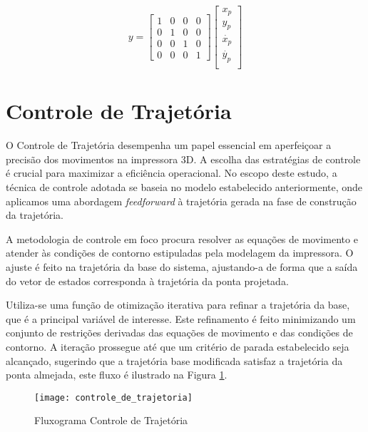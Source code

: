 \begin{equation}
    \label{eq:said_espa_esp}
    y
    =
    \begin{bmatrix}
        1 & 0 & 0 & 0 \\
        0 & 1 & 0 & 0 \\
        0 & 0 & 1 & 0 \\
        0 & 0 & 0 & 1
    \end{bmatrix}
    \begin{bmatrix}
        x_p \\    
        y_p \\
        \dot{x_p} \\    
        \dot{y_p} \\
    \end{bmatrix}
\end{equation}

\section{Controle de Trajetória}
O Controle de Trajetória desempenha um papel essencial em aperfeiçoar a precisão dos movimentos na impressora 3D. A escolha das estratégias de controle é crucial para maximizar a eficiência operacional. No escopo deste estudo, a técnica de controle adotada se baseia no modelo estabelecido anteriormente, onde aplicamos uma abordagem \textit{feedforward} à trajetória gerada na fase de construção da trajetória.

A metodologia de controle em foco procura resolver as equações de movimento e atender às condições de contorno estipuladas pela modelagem da impressora. O ajuste é feito na trajetória da base do sistema, ajustando-a de forma que a saída do vetor de estados corresponda à trajetória da ponta projetada.

Utiliza-se uma função de otimização iterativa para refinar a trajetória da base, que é a principal variável de interesse. Este refinamento é feito minimizando um conjunto de restrições derivadas das equações de movimento e das condições de contorno. A iteração prossegue até que um critério de parada estabelecido seja alcançado, sugerindo que a trajetória base modificada satisfaz a trajetória da ponta almejada, este fluxo é ilustrado na Figura \ref{fig:controle_de_trajetoria}.

\begin{figure}[H]
    \centering
    \caption{Fluxograma Controle de Trajetória}
    \texttt{[image: controle\_de\_trajetoria]}

    \label{fig:controle_de_trajetoria}
\end{figure}

